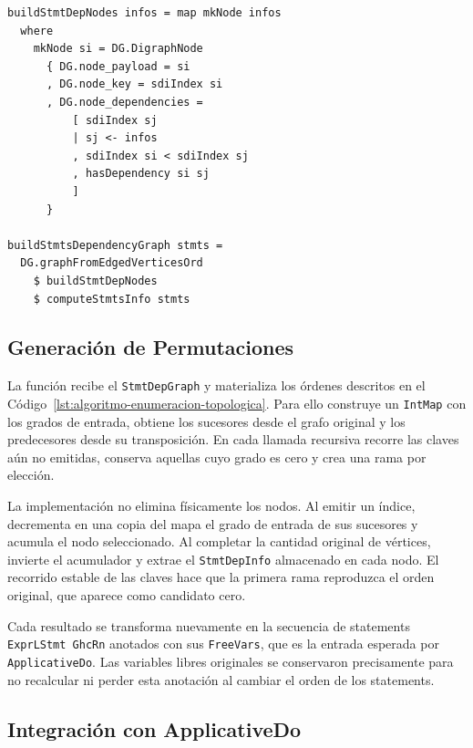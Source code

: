 \noindent\begin{minipage}{\textwidth}
\begin{lstlisting}[style=haskell,caption={Construcción de nodos y aristas mediante \texttt{GHC.Data.Graph.Directed}.},label={lst:build-stmt-dep-nodes}]
buildStmtDepNodes infos = map mkNode infos
  where
    mkNode si = DG.DigraphNode
      { DG.node_payload = si
      , DG.node_key = sdiIndex si
      , DG.node_dependencies =
          [ sdiIndex sj
          | sj <- infos
          , sdiIndex si < sdiIndex sj
          , hasDependency si sj
          ]
      }

buildStmtsDependencyGraph stmts =
  DG.graphFromEdgedVerticesOrd
    $ buildStmtDepNodes
    $ computeStmtsInfo stmts
\end{lstlisting}
\end{minipage}

\subsection{Generación de Permutaciones}
\label{sec:solucion-implementacion-permutaciones}

La función  recibe el \texttt{StmtDepGraph} y materializa los órdenes descritos en el Código~\ref{lst:algoritmo-enumeracion-topologica}. Para ello construye un \texttt{IntMap} con los grados de entrada, obtiene los sucesores desde el grafo original y los predecesores desde su transposición. En cada llamada recursiva recorre las claves aún no emitidas, conserva aquellas cuyo grado es cero y crea una rama por elección.

La implementación no elimina físicamente los nodos. Al emitir un índice, decrementa en una copia del mapa el grado de entrada de sus sucesores y acumula el nodo seleccionado. Al completar la cantidad original de vértices, invierte el acumulador y extrae el \texttt{StmtDepInfo} almacenado en cada nodo. El recorrido estable de las claves hace que la primera rama reproduzca el orden original, que aparece como candidato cero.

Cada resultado se transforma nuevamente en la secuencia de statements \texttt{ExprLStmt GhcRn} anotados con sus \texttt{FreeVars}, que es la entrada esperada por \texttt{ApplicativeDo}. Las variables libres originales se conservaron precisamente para no recalcular ni perder esta anotación al cambiar el orden de los statements.

\subsection{Integración con ApplicativeDo}
\label{sec:solucion-integracion-applicative-do}

